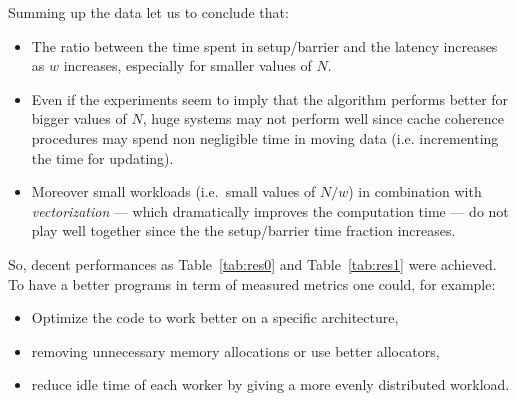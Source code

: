 Summing up the data let us to conclude that:
\begin{itemize}
	\item The ratio between the time spent in setup/barrier and the latency increases as $w$ increases, especially for smaller values of $N$.
	\item Even if the experiments seem to imply that the algorithm performs better for bigger values of $N$, huge systems may not perform well since cache coherence procedures may spend non negligible time in moving data (i.e. incrementing the time for updating).
	\item Moreover small workloads (i.e.\ small values of $N/w$) in combination with \emph{vectorization} --- which dramatically improves the computation time --- do not play well together since the the setup/barrier time fraction increases.
\end{itemize}

So, decent performances as Table~\ref{tab:res0} and Table~\ref{tab:res1} were achieved.
To have a better programs in term of measured metrics one could, for example:
\begin{itemize}
	\item Optimize the code to work better on a specific architecture,
	\item removing unnecessary memory allocations or use better allocators,
	\item reduce idle time of each worker by giving a more evenly distributed workload.
\end{itemize} 
